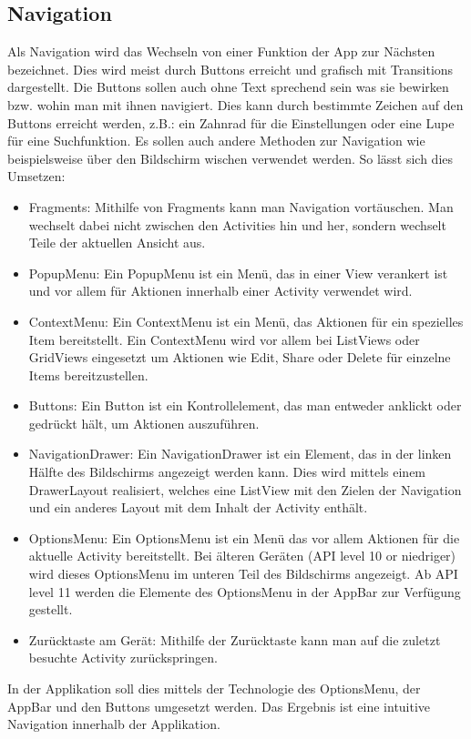 \documentclass[FIPLY_base.tex]{subfiles}
\begin{document}
\subsection{Navigation}
Als Navigation wird das Wechseln von einer Funktion der App zur Nächsten bezeichnet. Dies wird meist durch Buttons erreicht und grafisch mit Transitions dargestellt.
Die Buttons sollen auch ohne Text sprechend sein was sie bewirken bzw. wohin man mit ihnen navigiert. Dies kann durch bestimmte Zeichen auf den Buttons erreicht werden, z.B.: ein Zahnrad für die Einstellungen oder eine Lupe für eine Suchfunktion. Es sollen auch andere Methoden zur Navigation wie beispielsweise über den Bildschirm wischen verwendet werden.
So lässt sich dies Umsetzen:
\begin{itemize}
	\item Fragments: Mithilfe von Fragments kann man Navigation vortäuschen. Man wechselt dabei nicht zwischen den Activities hin und her, sondern wechselt Teile der aktuellen Ansicht aus.
	\item PopupMenu: Ein PopupMenu ist ein Menü, das in einer View verankert ist und vor allem für Aktionen innerhalb einer Activity verwendet wird.
	\item ContextMenu: Ein ContextMenu ist ein Menü, das Aktionen für ein spezielles Item bereitstellt. Ein ContextMenu wird vor allem bei ListViews oder GridViews eingesetzt um Aktionen wie Edit, Share oder Delete für einzelne Items bereitzustellen.
	\item Buttons: Ein Button ist ein Kontrollelement, das man entweder anklickt oder gedrückt hält, um Aktionen auszuführen.
	\item NavigationDrawer: Ein NavigationDrawer ist ein Element, das in der linken Hälfte des Bildschirms angezeigt werden kann. Dies wird mittels einem DrawerLayout realisiert, welches eine ListView mit den Zielen der Navigation und ein anderes Layout mit dem Inhalt der Activity enthält.
	\item OptionsMenu: Ein OptionsMenu ist ein Menü das vor allem Aktionen für die aktuelle Activity bereitstellt. 
	Bei älteren Geräten (API level 10 or niedriger) wird dieses OptionsMenu im unteren Teil des Bildschirms angezeigt.
	Ab API level 11 werden die Elemente des OptionsMenu in der AppBar zur Verfügung gestellt.
	\item Zurücktaste am Gerät: Mithilfe der Zurücktaste kann man auf die zuletzt besuchte Activity zurückspringen.
\end{itemize}
In der Applikation soll dies mittels der Technologie des OptionsMenu, der AppBar und den Buttons umgesetzt werden. Das Ergebnis ist eine intuitive Navigation innerhalb der Applikation.
\end{document}
